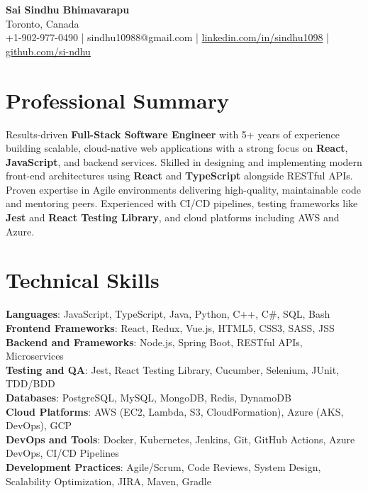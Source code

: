 \documentclass[letterpaper,11pt]{article}
\begin{document}
\begin{center}
  {\Large \textbf{Sai Sindhu Bhimavarapu}} \\
  Toronto, Canada \\
  +1-902-977-0490 \enspace | \enspace sindhu10988@gmail.com \enspace | \enspace \href{https://www.linkedin.com/in/sindhu1098/}{linkedin.com/in/sindhu1098} \enspace | \enspace \href{https://github.com/si-ndhu}{github.com/si-ndhu}
\end{center}

\section{Professional Summary}
  \begin{itemize}[leftmargin=0.15in, label={}]
    \small{\item{
     Results-driven \textbf{Full-Stack Software Engineer} with 5+ years of experience building scalable, cloud-native web applications with a strong focus on \textbf{React}, \textbf{JavaScript}, and backend services. Skilled in designing and implementing modern front-end architectures using \textbf{React} and \textbf{TypeScript} alongside RESTful APIs. Proven expertise in Agile environments delivering high-quality, maintainable code and mentoring peers. Experienced with CI/CD pipelines, testing frameworks like \textbf{Jest} and \textbf{React Testing Library}, and cloud platforms including AWS and Azure.
    }}
  \end{itemize}
\vspace{-16pt}

\section{Technical Skills}
 \begin{itemize}[leftmargin=0.15in, label={}]
    \small{\item{
     \textbf{Languages}: JavaScript, TypeScript, Java, Python, C++, C\#, SQL, Bash \\
     \textbf{Frontend Frameworks}: React, Redux, Vue.js, HTML5, CSS3, SASS, JSS \\
     \textbf{Backend and Frameworks}: Node.js, Spring Boot, RESTful APIs, Microservices \\
     \textbf{Testing and QA}: Jest, React Testing Library, Cucumber, Selenium, JUnit, TDD/BDD \\
     \textbf{Databases}: PostgreSQL, MySQL, MongoDB, Redis, DynamoDB \\
     \textbf{Cloud Platforms}: AWS (EC2, Lambda, S3, CloudFormation), Azure (AKS, DevOps), GCP \\
     \textbf{DevOps and Tools}: Docker, Kubernetes, Jenkins, Git, GitHub Actions, Azure DevOps, CI/CD Pipelines \\
     \textbf{Development Practices}: Agile/Scrum, Code Reviews, System Design, Scalability Optimization, JIRA, Maven, Gradle
    }}
 \end{itemize}
\vspace{-16pt}
\end{document}
